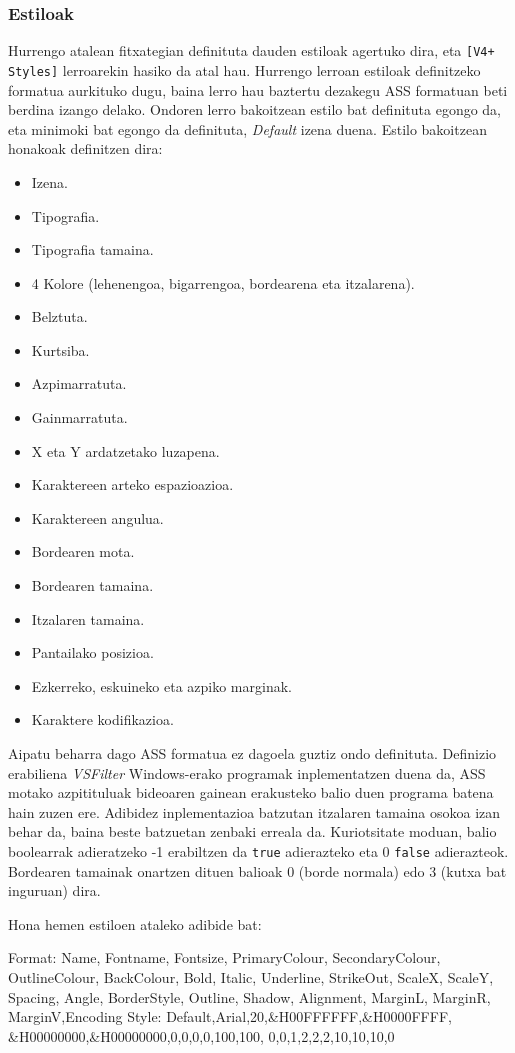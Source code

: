 \subsubsection{Estiloak}
Hurrengo atalean fitxategian definituta dauden estiloak agertuko dira, eta \texttt{[V4+ Styles]} lerroarekin hasiko da atal hau. Hurrengo lerroan estiloak definitzeko formatua aurkituko dugu, baina lerro hau baztertu dezakegu ASS formatuan beti berdina izango delako. Ondoren lerro bakoitzean estilo bat definituta egongo da, eta minimoki bat egongo da definituta, \textit{Default} izena duena. Estilo bakoitzean honakoak definitzen dira:
\begin{itemize}
	\item Izena.
	\item Tipografia.
	\item Tipografia tamaina.
	\item 4 Kolore (lehenengoa, bigarrengoa, bordearena eta itzalarena).
	\item Belztuta.
	\item Kurtsiba.
	\item Azpimarratuta.
	\item Gainmarratuta.
	\item X eta Y ardatzetako luzapena.
	\item Karaktereen arteko espazioazioa.
	\item Karaktereen angulua.
	\item Bordearen mota.
	\item Bordearen tamaina.
	\item Itzalaren tamaina.
	\item Pantailako posizioa.
	\item Ezkerreko, eskuineko eta azpiko marginak.
	\item Karaktere kodifikazioa.
\end{itemize}
Aipatu beharra dago ASS formatua ez dagoela guztiz ondo definituta. Definizio erabiliena \textit{VSFilter} Windows-erako programak inplementatzen duena da, ASS motako azpitituluak bideoaren gainean erakusteko balio duen programa batena hain zuzen ere. Adibidez inplementazioa batzutan itzalaren tamaina osokoa izan behar da, baina beste batzuetan zenbaki erreala da. Kuriotsitate moduan, balio boolearrak adieratzeko -1 erabiltzen da \texttt{true} adierazteko eta 0 \texttt{false} adierazteok. Bordearen tamainak onartzen dituen balioak 0 (borde normala) edo 3 (kutxa bat inguruan) dira.

Hona hemen estiloen ataleko adibide bat:
\begin{verbatimtab}[8]
[V4+ Styles]
Format: Name, Fontname, Fontsize, PrimaryColour,
	 SecondaryColour, OutlineColour, BackColour,
 	 Bold, Italic, Underline, StrikeOut, ScaleX,
	 ScaleY, Spacing, Angle, BorderStyle, Outline,
	 Shadow, Alignment, MarginL, MarginR,
	 MarginV,Encoding
Style: Default,Arial,20,&H00FFFFFF,&H0000FFFF,
	 &H00000000,&H00000000,0,0,0,0,100,100,
	 0,0,1,2,2,2,10,10,10,0
\end{verbatimtab}

